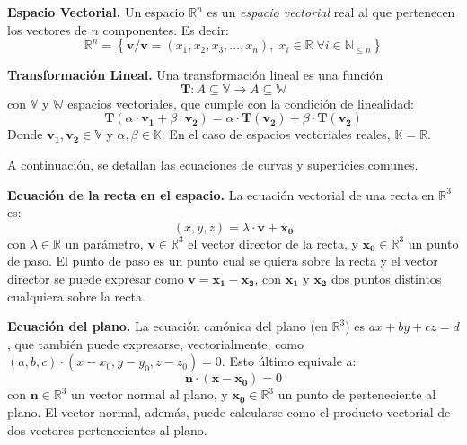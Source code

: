 \begin{definition}\textbf{Espacio Vectorial.}
    Un espacio $\mathbb{R}^n$ es un \emph{espacio vectorial} real al que pertenecen
    los vectores de $n$ componentes. Es decir:
    \begin{equation*}
        \mathbb{R}^n = \left\{ \boldsymbol{v} / \boldsymbol{v}=(x_1,x_2,x_3,...,x_n), \; x_i \in \mathbb{R} \;\forall i \in \mathbb{N}_{\leq n} \right\}
    \end{equation*}
\end{definition}
\begin{definition}\textbf{Transformación Lineal.}
    Una transformación lineal es una función 
    \begin{equation*}
        \boldsymbol{T}:A\subseteq \mathbb{V} \rightarrow A\subseteq \mathbb{W}
    \end{equation*}
    con $\mathbb{V}$ y $\mathbb{W}$ espacios vectoriales, que cumple con la condición de linealidad:
    \begin{equation*}
        \boldsymbol{T}(\alpha \cdot \boldsymbol{v_1} + \beta \cdot \boldsymbol{v_2})=\alpha \cdot \boldsymbol{T}(\boldsymbol{v_2}) + \beta \cdot \boldsymbol{T}(\boldsymbol{v_2})
    \end{equation*}
    Donde $\boldsymbol{v_1},\boldsymbol{v_2} \in \mathbb{V}$ y $\alpha,\beta \in \mathbb{K}$. En el caso de espacios vectoriales reales,
    $\mathbb{K} = \mathbb{R}$.
\end{definition}
A continuación, se detallan las ecuaciones de curvas y superficies comunes.
\begin{definition}\textbf{Ecuación de la recta en el espacio.}
    La ecuación vectorial de una recta en $\mathbb{R}^3$ es:
    \begin{equation*}
        (x,y,z) = \lambda \cdot \boldsymbol{v} + \boldsymbol{x_0}
    \end{equation*}
    con $\lambda\in\mathbb{R}$ un parámetro, $\boldsymbol{v}\in\mathbb{R}^3$ el vector director de la recta,
    y $\boldsymbol{x_0}\in\mathbb{R}^3$ un punto de paso. El punto de paso es un punto cual se quiera
    sobre la recta y el vector director se puede expresar como $\boldsymbol{v}=\boldsymbol{x_1}-\boldsymbol{x_2}$, 
    con $\boldsymbol{x_1}$ y $\boldsymbol{x_2}$ dos puntos distintos cualquiera sobre la recta.
\end{definition}
\begin{definition}\textbf{Ecuación del plano.}
    La ecuación canónica del plano (en $\mathbb{R}^3$) es $ax+by+cz=d$, que también puede expresarse,
    vectorialmente, como $(a,b,c)\cdot(x-x_0,y-y_0,z-z_0)=0$. Esto último equivale a:
    \begin{equation*}
        \boldsymbol{n}\cdot(\boldsymbol{x} - \boldsymbol{x_0})=0
    \end{equation*}
    con $\boldsymbol{n}\in\mathbb{R}^3$ un vector normal al plano, y $\boldsymbol{x_0}\in\mathbb{R}^3$
    un punto de perteneciente al plano. El vector normal, además, puede calcularse como el producto vectorial
    de dos vectores pertenecientes al plano.
\end{definition}
